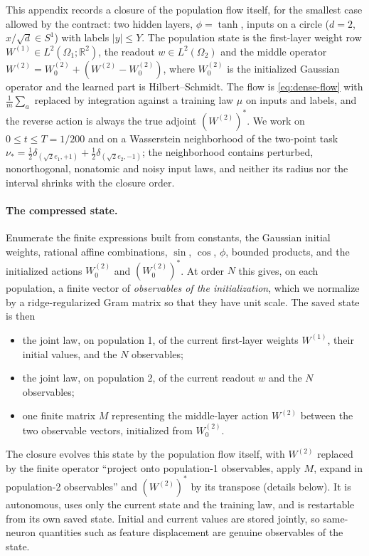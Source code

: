 \documentclass[11pt]{article}
\theoremstyle{definition}
\theoremstyle{remark}
\newcommand{\R}{\mathbb{R}}
\begin{document}
This appendix records a closure of the population flow itself, for the smallest
case allowed by the contract: two hidden layers, $\phi=\tanh$, inputs on
a circle ($d=2$, $x/\sqrt d\in S^1$) with labels $|y|\le Y$.  The population state
is the first-layer weight row $W^{(1)}\in L^2(\Omega_1;\R^2)$, the readout
$w\in L^2(\Omega_2)$ and the middle operator $W^{(2)}=W^{(2)}_0+(W^{(2)}-W^{(2)}_0)$,
where $W^{(2)}_0$ is the initialized Gaussian operator and the learned part is
Hilbert--Schmidt.  The flow is \eqref{eq:dense-flow} with $\frac1m\sum_a$
replaced by integration against a training law $\mu$ on inputs and labels, and
the reverse action is always the true adjoint $(W^{(2)})^*$.  We work on
$0\le t\le T=1/200$ and on a Wasserstein neighborhood of the two-point task
$\nu_*=\tfrac12\delta_{(\sqrt2e_1,+1)}+\tfrac12\delta_{(\sqrt2e_2,-1)}$; the
neighborhood contains perturbed, nonorthogonal, nonatomic and noisy input laws,
and neither its radius nor the interval shrinks with the closure order.

\paragraph{The compressed state.}
Enumerate the finite expressions built from constants, the Gaussian initial
weights, rational affine combinations, $\sin$, $\cos$, $\phi$, bounded products,
and the initialized actions $W^{(2)}_0$ and $(W^{(2)}_0)^*$.  At order $N$ this
gives, on each population, a finite vector of \emph{observables of the
initialization}, which we normalize by a ridge-regularized Gram matrix so that
they have unit scale.  The saved state is then
\begin{itemize}
\item the joint law, on population 1, of the current first-layer weights
$W^{(1)}$, their initial values, and the $N$ observables;
\item the joint law, on population 2, of the current readout $w$ and the $N$
observables;
\item one finite matrix $M$ representing the middle-layer action
$W^{(2)}$ between the two observable vectors, initialized from $W^{(2)}_0$.
\end{itemize}
The closure evolves this state by the population flow itself, with $W^{(2)}$
replaced by the finite operator ``project onto population-1 observables, apply
$M$, expand in population-2 observables'' and $(W^{(2)})^*$ by its transpose
(details below).  It is autonomous, uses only the current state and the
training law, and is restartable from its own saved state.  Initial and current
values are stored jointly, so same-neuron quantities such as feature displacement
are genuine observables of the state.
\end{document}
